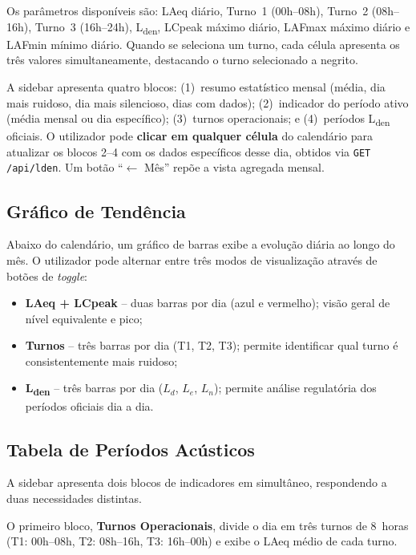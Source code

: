 \documentclass[12pt,a4paper]{report}
\begin{document}
Os parâmetros disponíveis são: LAeq diário, Turno~1 (00h--08h), Turno~2 (08h--16h), Turno~3 (16h--24h), L\textsubscript{den}, LCpeak máximo diário, LAFmax máximo diário e LAFmin mínimo diário. Quando se seleciona um turno, cada célula apresenta os três valores simultaneamente, destacando o turno selecionado a negrito.

A sidebar apresenta quatro blocos: (1)~resumo estatístico mensal (média, dia mais ruidoso, dia mais silencioso, dias com dados); (2)~indicador do período ativo (média mensal ou dia específico); (3)~turnos operacionais; e (4)~períodos L\textsubscript{den} oficiais. O utilizador pode \textbf{clicar em qualquer célula} do calendário para atualizar os blocos 2--4 com os dados específicos desse dia, obtidos via \texttt{GET /api/lden}. Um botão ``$\leftarrow$ Mês'' repõe a vista agregada mensal.

\subsection{Gráfico de Tendência}

Abaixo do calendário, um gráfico de barras exibe a evolução diária ao longo do mês. O utilizador pode alternar entre três modos de visualização através de botões de \textit{toggle}:

\begin{itemize}[nosep]
  \item \textbf{LAeq + LCpeak} -- duas barras por dia (azul e vermelho); visão geral de nível equivalente e pico;
  \item \textbf{Turnos} -- três barras por dia (T1, T2, T3); permite identificar qual turno é consistentemente mais ruidoso;
  \item \textbf{L\textsubscript{den}} -- três barras por dia ($L_d$, $L_e$, $L_n$); permite análise regulatória dos períodos oficiais dia a dia.
\end{itemize}

\subsection{Tabela de Períodos Acústicos}

A sidebar apresenta dois blocos de indicadores em simultâneo, respondendo a duas necessidades distintas.

O primeiro bloco, \textbf{Turnos Operacionais}, divide o dia em três turnos de 8~horas (T1: 00h--08h, T2: 08h--16h, T3: 16h--00h) e exibe o LAeq médio de cada turno.
\end{document}
